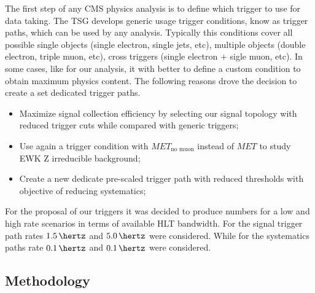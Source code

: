 


The first step of any \gls{CMS} physics analysis is to define which trigger to use for data taking. The \gls{TSG} develops generic usage trigger conditions, know as trigger paths, which can be used by any analysis. Typically this conditions cover all possible single objects (single electron, single jets, etc), multiple objects (double electron, triple muon, etc), cross triggers (single electron $+$ sigle muon, etc). In some cases, like for our analysis, it with better to define a custom condition to obtain maximum physics content. The following reasons drove the decision to create a set dedicated trigger paths.

\begin{itemize}
  \item Maximize signal collection efficiency by selecting our signal topology with reduced trigger cuts while compared with generic triggers;
  \item Use again a trigger condition with $MET_{\text{no muon}}$ instead of $MET$ to study \gls{EWK} Z irreducible background;
  \item Create a new dedicate pre-scaled trigger path with reduced thresholds with objective of reducing systematics;
\end{itemize}

For the proposal of our triggers it was decided to produce numbers for a low and high rate scenarios in terms of available \gls{HLT} bandwidth. For the signal trigger path rates $1.5\,\hertz$ and $5.0\,\hertz$ were considered. While for the systematics paths rate $0.1\,\hertz$ and $0.1\,\hertz$ were considered.

\subsection{Methodology}
\label{SECTION:RunIITriggerStudies_Methodology}

